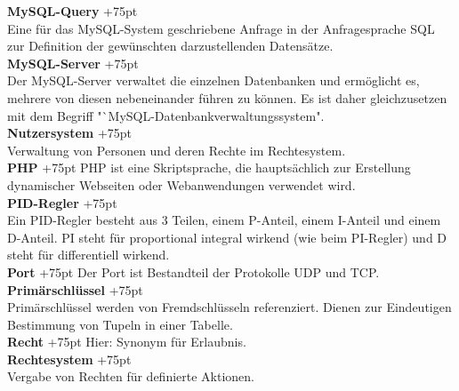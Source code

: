 \documentclass[fontsize = 12pt, paper = a4]{scrreprt}
\begin{document}
\begin{spacing}{0.95}
\textbf{MySQL-Query}
\hangindent+75pt  
\\
Eine für das MySQL-System geschriebene Anfrage in der Anfragesprache SQL zur Definition der gewünschten darzustellenden Datensätze.\\

\textbf{MySQL-Server}
\hangindent+75pt 
\\
Der MySQL-Server verwaltet die einzelnen Datenbanken und ermöglicht es, mehrere von diesen nebeneinander führen zu können. Es ist daher gleichzusetzen mit dem Begriff "`MySQL-Datenbankverwaltungssystem".\\

\textbf{Nutzersystem}
\hangindent+75pt  \\
Verwaltung von Personen und deren Rechte im Rechtesystem.\\


\textbf{PHP}
\hangindent+75pt 
\hspace*{13.5mm}
PHP ist eine Skriptsprache, die hauptsächlich zur Erstellung dynamischer Webseiten oder Webanwendungen verwendet wird.\\

\textbf{PID-Regler}
\hangindent+75pt  \\
Ein PID-Regler besteht aus 3 Teilen, einem P-Anteil, einem I-Anteil und einem D-Anteil. PI steht für proportional integral wirkend (wie beim PI-Regler) und D steht für differentiell wirkend.\\

\textbf{Port}
\hangindent+75pt 
\hspace*{14.2mm}
Der Port ist Bestandteil der Protokolle UDP und TCP.\\

\textbf{Primärschlüssel}
\hangindent+75pt  \\
Primärschlüssel werden von Fremdschlüsseln referenziert. Dienen zur Eindeutigen Bestimmung von Tupeln in einer Tabelle.\\

\textbf{Recht}
\hangindent+75pt  
\hspace*{11.5mm} Hier: Synonym für Erlaubnis.\\

\textbf{Rechtesystem}
\hangindent+75pt  \\
Vergabe von Rechten für definierte Aktionen.\\


\end{spacing}
\end{document}
